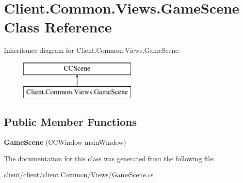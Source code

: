 \hypertarget{classClient_1_1Common_1_1Views_1_1GameScene}{\section{Client.\-Common.\-Views.\-Game\-Scene Class Reference}
\label{classClient_1_1Common_1_1Views_1_1GameScene}
}
Inheritance diagram for Client.\-Common.\-Views.\-Game\-Scene\-:\begin{figure}[H]
\begin{center}
\leavevmode
\includegraphics[height=2.000000cm]{classClient_1_1Common_1_1Views_1_1GameScene}
\end{center}
\end{figure}
\subsection*{Public Member Functions}
\begin{DoxyCompactItemize}
\item 
\hypertarget{classClient_1_1Common_1_1Views_1_1GameScene_a946494de04b027e43b5d2229cc780f7e}{{\bfseries Game\-Scene} (C\-C\-Window main\-Window)}\label{classClient_1_1Common_1_1Views_1_1GameScene_a946494de04b027e43b5d2229cc780f7e}

\end{DoxyCompactItemize}


The documentation for this class was generated from the following file\-:\begin{DoxyCompactItemize}
\item 
client/client/client.\-Common/\-Views/Game\-Scene.\-cs\end{DoxyCompactItemize}

